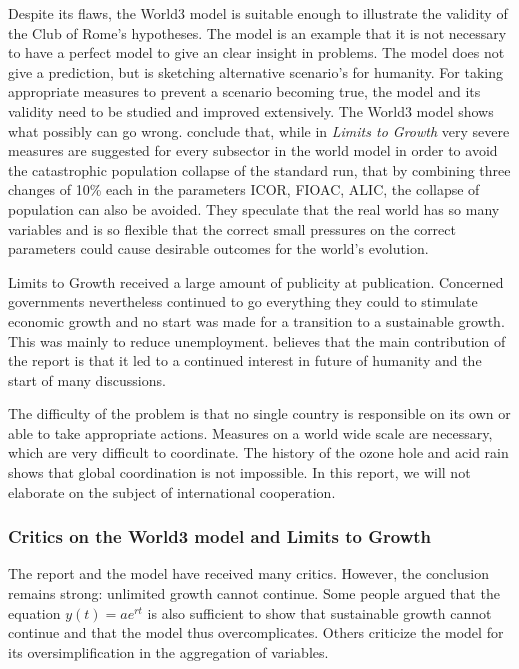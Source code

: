 \documentclass[10pt,a4paper]{scrartcl}
\begin{document}
Despite its flaws, the World3 model is suitable enough to illustrate the validity of the Club of Rome's hypotheses. The model is an example that it is not necessary to have a perfect model to give an clear insight in problems. The model does not give a prediction, but is sketching alternative scenario's for humanity. For taking appropriate measures to prevent a scenario becoming true, the model and its validity need to be studied and improved extensively. The World3 model shows what possibly can go wrong. \cite{vermeulen1976parameter} conclude that, while in \emph{Limits to Growth} very severe measures are suggested for every subsector in the world model in order to avoid the catastrophic population collapse of the standard run, that by combining three changes of 10\% each in the parameters ICOR, FIOAC, ALIC, the collapse of population can also be avoided. They speculate that the real world has so many variables and is so flexible that the correct small pressures on the correct parameters could cause desirable outcomes for the world's evolution.

Limits to Growth received a large amount of publicity at publication. Concerned governments nevertheless continued to go everything they could to stimulate economic growth and no start was made for a transition to a sustainable growth. This was mainly to reduce unemployment. \cite{voorbijdegrenzen} believes that the main contribution of the report is that it led to a continued interest in future of humanity and the start of many discussions.

The difficulty of the problem is that no single country is responsible on its own or able to take appropriate actions. Measures on a world wide scale are necessary, which are very difficult to coordinate. The history of the ozone hole and acid rain shows that global coordination is not impossible. In this report, we will not elaborate on the subject of international cooperation.

\subsubsection*{Critics on the World3 model and Limits to Growth}

The report and the model have received many critics. However, the conclusion remains strong: unlimited growth cannot continue. Some people argued that the equation $y(t) = ae^{rt}$ is also sufficient to show that sustainable growth cannot continue and that the model thus overcomplicates. Others criticize the model for its oversimplification in the aggregation of variables.
\end{document}
